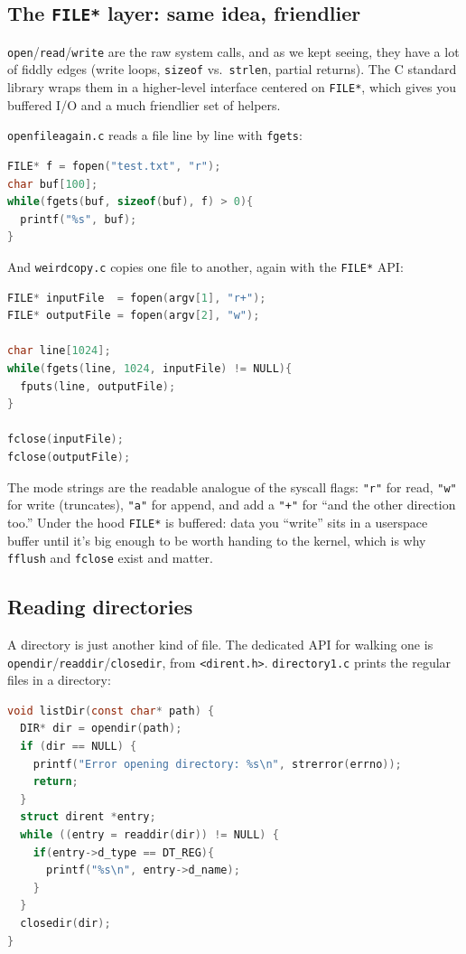 \documentclass[11pt]{article}
\begin{document}
\subsection*{The \texttt{FILE*} layer: same idea, friendlier}

\texttt{open}/\texttt{read}/\texttt{write} are the raw system calls,
and as we kept seeing, they have a lot of fiddly edges (write loops,
\texttt{sizeof} vs.\ \texttt{strlen}, partial returns). The C
standard library wraps them in a higher-level interface centered on
\texttt{FILE*}, which gives you buffered I/O and a much friendlier
set of helpers.

\texttt{openfileagain.c} reads a file line by line with \texttt{fgets}:

\begin{lstlisting}[language=C]
FILE* f = fopen("test.txt", "r");
char buf[100];
while(fgets(buf, sizeof(buf), f) > 0){
  printf("%s", buf);
}
\end{lstlisting}

And \texttt{weirdcopy.c} copies one file to another, again with the
\texttt{FILE*} API:

\begin{lstlisting}[language=C]
FILE* inputFile  = fopen(argv[1], "r+");
FILE* outputFile = fopen(argv[2], "w");

char line[1024];
while(fgets(line, 1024, inputFile) != NULL){
  fputs(line, outputFile);
}

fclose(inputFile);
fclose(outputFile);
\end{lstlisting}

The mode strings are the readable analogue of the syscall flags:
\texttt{"r"} for read, \texttt{"w"} for write (truncates), \texttt{"a"}
for append, and add a \texttt{"+"} for ``and the other direction
too.'' Under the hood \texttt{FILE*} is buffered: data you ``write''
sits in a userspace buffer until it's big enough to be worth handing
to the kernel, which is why \texttt{fflush} and \texttt{fclose} exist
and matter.

\subsection*{Reading directories}

A directory is just another kind of file. The dedicated API for
walking one is \texttt{opendir}/\texttt{readdir}/\texttt{closedir},
from \texttt{<dirent.h>}. \texttt{directory1.c} prints the regular
files in a directory:

\begin{lstlisting}[language=C]
void listDir(const char* path) {
  DIR* dir = opendir(path);
  if (dir == NULL) {
    printf("Error opening directory: %s\n", strerror(errno));
    return;
  }
  struct dirent *entry;
  while ((entry = readdir(dir)) != NULL) {
    if(entry->d_type == DT_REG){
      printf("%s\n", entry->d_name);
    }
  }
  closedir(dir);
}
\end{lstlisting}
\end{document}
